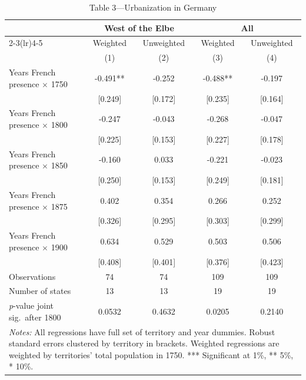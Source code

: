 \begin{table}[htbp]
\centering
\caption{Table 3---Urbanization in Germany}
\label{tab:table3}
\begin{tabular}{lcccc}
\toprule
 & \multicolumn{2}{c}{West of the Elbe} & \multicolumn{2}{c}{All} \\
\cmidrule(lr){2-3}\cmidrule(lr){4-5}
 & Weighted & Unweighted & Weighted & Unweighted \\
 & (1) & (2) & (3) & (4) \\
\midrule
Years French presence $\times$ 1750 & -0.491** & -0.252 & -0.488** & -0.197 \\
 & [0.249] & [0.172] & [0.235] & [0.164] \\
\addlinespace
Years French presence $\times$ 1800 & -0.247 & -0.043 & -0.268 & -0.047 \\
 & [0.225] & [0.153] & [0.227] & [0.178] \\
\addlinespace
Years French presence $\times$ 1850 & -0.160 & 0.033 & -0.221 & -0.023 \\
 & [0.250] & [0.153] & [0.249] & [0.181] \\
\addlinespace
Years French presence $\times$ 1875 & 0.402 & 0.354 & 0.266 & 0.252 \\
 & [0.326] & [0.295] & [0.303] & [0.299] \\
\addlinespace
Years French presence $\times$ 1900 & 0.634 & 0.529 & 0.503 & 0.506 \\
 & [0.408] & [0.401] & [0.376] & [0.423] \\
\addlinespace[6pt]
Observations & 74 & 74 & 109 & 109 \\
Number of states & 13 & 13 & 19 & 19 \\
\textit{p}-value joint sig.\ after 1800 & 0.0532 & 0.4632 & 0.0205 & 0.2140 \\
\bottomrule
\multicolumn{5}{p{0.95\linewidth}}{\footnotesize
 \textit{Notes:} All regressions have full set of territory and year dummies.
 Robust standard errors clustered by territory in brackets.
 Weighted regressions are weighted by territories' total population in 1750.
 *** Significant at 1\%, ** 5\%, * 10\%.}
\end{tabular}
\end{table}
